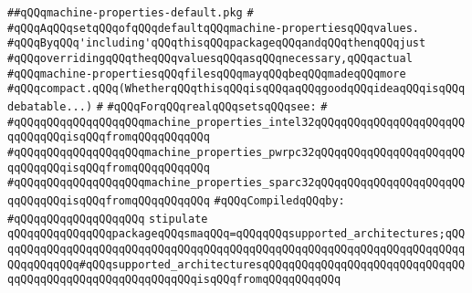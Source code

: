 \label{src/lib/compiler/back/low/main/main/machine-properties-default.pkg}
\verb|##qQQqmachine-properties-default.pkg|\newline
\verb|#|\newline
\verb|#qQQqAqQQqsetqQQqofqQQqdefaultqQQqmachine-propertiesqQQqvalues.|\newline
\verb|#qQQqByqQQq'including'qQQqthisqQQqpackageqQQqandqQQqthenqQQqjust|\newline
\verb|#qQQqoverridingqQQqtheqQQqvaluesqQQqasqQQqnecessary,qQQqactual|\newline
\verb|#qQQqmachine-propertiesqQQqfilesqQQqmayqQQqbeqQQqmadeqQQqmore|\newline
\verb|#qQQqcompact.qQQq(WhetherqQQqthisqQQqisqQQqaqQQqgoodqQQqideaqQQqisqQQqdebatable...)|\newline
\verb|#|\newline
\verb|#qQQqForqQQqrealqQQqsetsqQQqsee:|\newline
\verb|#|\newline
\verb|#qQQqqQQqqQQqqQQqqQQqmachine_properties_intel32qQQqqQQqqQQqqQQqqQQqqQQqqQQqqQQqisqQQqfromqQQqqQQqqQQq|\newline
\verb|#qQQqqQQqqQQqqQQqqQQqmachine_properties_pwrpc32qQQqqQQqqQQqqQQqqQQqqQQqqQQqqQQqisqQQqfromqQQqqQQqqQQq|\newline
\verb|#qQQqqQQqqQQqqQQqqQQqmachine_properties_sparc32qQQqqQQqqQQqqQQqqQQqqQQqqQQqqQQqisqQQqfromqQQqqQQqqQQq|\newline
\newline
\verb|#qQQqCompiledqQQqby:|\newline
\verb|#qQQqqQQqqQQqqQQqqQQq|\newline
\newline
\verb|stipulate|\newline
\verb|qQQqqQQqqQQqqQQqpackageqQQqsmaqQQq=qQQqqQQqsupported_architectures;qQQqqQQqqQQqqQQqqQQqqQQqqQQqqQQqqQQqqQQqqQQqqQQqqQQqqQQqqQQqqQQqqQQqqQQqqQQqqQQqqQQq#qQQqsupported_architecturesqQQqqQQqqQQqqQQqqQQqqQQqqQQqqQQqqQQqqQQqqQQqqQQqqQQqqQQqqQQqisqQQqfromqQQqqQQqqQQq|\newline
